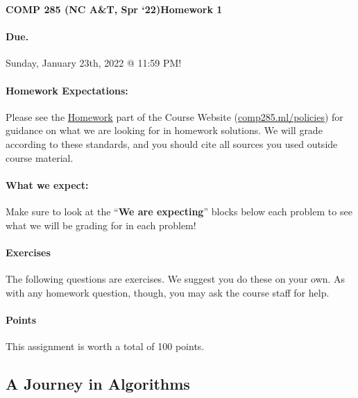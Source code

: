 \documentclass [12pt]{article}
\begin{document}
 

{\LARGE \textbf {COMP 285 (NC A\&T, Spr `22)}\hfill \textbf {Homework 1} } 
\vspace {1em} 
\begin {Instruction} 

\paragraph {Due.} Sunday, January 23th, 2022 @ 11:59 PM!
\end {Instruction} 

\vspace {1em} 
\begin {Instruction} \paragraph {Homework Expectations:} Please see the \href{https://www.comp285.ml/homework/#general-homework-information}{Homework} part of the Course Website (\href{https://www.comp285.ml/policies/#collaboration-policy-and-honor-code}{comp285.ml/policies}) for guidance on what we are looking for in homework solutions. We will grade according to these standards, and you should cite all sources you used outside course material.

\paragraph {What we expect:} Make sure to look at the ``\textbf {We are expecting}'' blocks below each problem to see what we will be grading for in each problem! \end {Instruction}

\vspace {1em} 
\begin {Instruction} 

\paragraph {Exercises} The following questions are exercises. We suggest you do these on your own. As with any homework question, though, you may ask the course staff for help.

\paragraph {Points} This assignment is worth a total of 100 points.
\end {Instruction} 

\begin{centering}
\section*{A Journey in Algorithms}
\end{centering}
\end{document}
